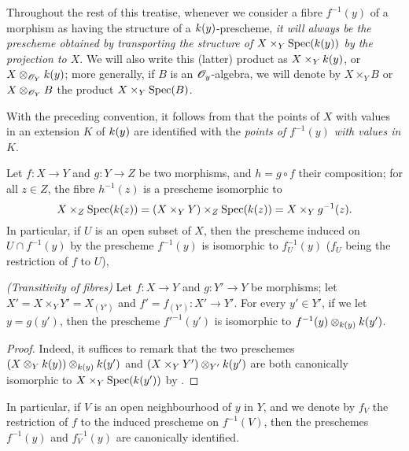 \begin{env}[3.6.2]
\label{I.3.6.2}
Throughout the rest of this treatise, whenever we consider a fibre $f^{-1}(y)$ of a morphism as having the structure of a $k(y)$-prescheme, \emph{it will always be the prescheme obtained by transporting the structure of $X\times_Y\operatorname{Spec}(k(y))$ by the projection to $X$}.
We will also write this (latter) product as $X\times_Yk(y)$, or $X\otimes_{\mathscr{O}_Y}k(y)$; more generally, if $B$ is an $\mathscr{O}_y$-algebra, we will denote by $X\times_Y B$ or $X\otimes_{\mathscr{O}_Y}B$ the product $X\times_Y\operatorname{Spec}(B)$.
\end{env}

With the preceding convention, it follows from  that the points of $X$ with values in an extension $K$ of $k(y)$ are identified with the \emph{points of $f^{-1}(y)$ with values in $K$}.

\begin{env}[3.6.3]
\label{I.3.6.3}
Let $f:X\to Y$ and $g:Y\to Z$ be two morphisms, and $h=g\circ f$ their composition; for all $z\in Z$, the fibre $h^{-1}(z)$ is a prescheme isomorphic to
\[
  X\times_Z\operatorname{Spec}(k(z))=(X\times_Y Y)\times_Z\operatorname{Spec}(k(z))=X\times_Y g^{-1}(z).
\]
In particular, if $U$ is an open subset of $X$, then the prescheme induced on $U\cap f^{-1}(y)$ by the prescheme $f^{-1}(y)$ is isomorphic to $f^{-1}_U(y)$ ($f_U$ being the restriction of $f$ to $U$),
\end{env}

\begin{proposition}[3.6.4]
\label{I.3.6.4}
\emph{(Transitivity of fibres)}
Let $f:X\to Y$ and $g:Y'\to Y$ be morphisms; let $X'=X\times_Y Y'=X_{(Y')}$ and $f'=f_{(Y')}:X'\to Y'$.
For every $y'\in Y'$, if we let $y=g(y')$, then the prescheme $f'^{-1}(y')$ is isomorphic to $f^{-1}(y)\otimes_{k(y)}k(y')$.
\end{proposition}

\begin{proof}
Indeed, it suffices to remark that the two preschemes $(X\otimes_Yk(y))\otimes_{k(y)}k(y')$ and $(X\times_Y Y')\otimes_{Y'}k(y')$ are both canonically isomorphic to $X\times_Y\operatorname{Spec}(k(y'))$ by .
\end{proof}

In particular, if $V$ is an open neighbourhood of $y$ in $Y$, and we denote by $f_V$ the restriction of $f$ to the induced prescheme on $f^{-1}(V)$, then the preschemes $f^{-1}(y)$ and $f^{-1}_V(y)$ are canonically identified.

